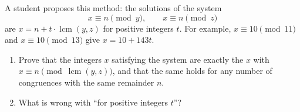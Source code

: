 A student proposes this method: the solutions of the system
\[x\equiv n\pmod y,\qquad x\equiv n\pmod z\]
are $x=n+t\cdot\operatorname{lcm}(y,z)$ for positive integers $t$. For example, $x\equiv10\pmod{11}$ and $x\equiv10\pmod{13}$ give $x=10+143t$.
\begin{enumerate}
\item[(a)] Prove that the integers $x$ satisfying the system are exactly the $x$ with $x\equiv n\pmod{\operatorname{lcm}(y,z)}$, and that the same holds for any number of congruences with the same remainder $n$.
\item[(b)] What is wrong with ``for positive integers $t$''?
\end{enumerate}
